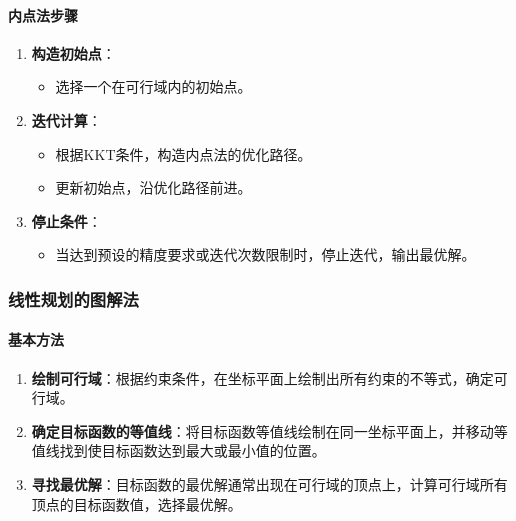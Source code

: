 \documentclass[UTF8]{ctexart}
\begin{document}
\paragraph{内点法步骤}
\begin{enumerate}
    \item \textbf{构造初始点}：
        \begin{itemize}
            \item 选择一个在可行域内的初始点。
        \end{itemize}
    \item \textbf{迭代计算}：
        \begin{itemize}
            \item 根据KKT条件，构造内点法的优化路径。
            \item 更新初始点，沿优化路径前进。
        \end{itemize}
    \item \textbf{停止条件}：
        \begin{itemize}
            \item 当达到预设的精度要求或迭代次数限制时，停止迭代，输出最优解。
        \end{itemize}
\end{enumerate}

\subsubsection{线性规划的图解法}
\paragraph{基本方法}
\begin{enumerate}
    \item \textbf{绘制可行域}：根据约束条件，在坐标平面上绘制出所有约束的不等式，确定可行域。
    \item \textbf{确定目标函数的等值线}：将目标函数等值线绘制在同一坐标平面上，并移动等值线找到使目标函数达到最大或最小值的位置。
    \item \textbf{寻找最优解}：目标函数的最优解通常出现在可行域的顶点上，计算可行域所有顶点的目标函数值，选择最优解。
\end{enumerate}
\end{document}
